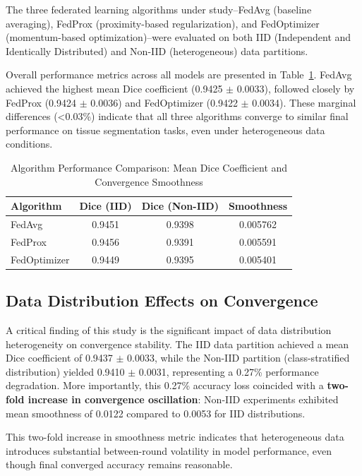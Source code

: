 \documentclass[conference]{IEEEtran}
\begin{document}
The three federated learning algorithms under study--FedAvg (baseline averaging), FedProx (proximity-based regularization), and FedOptimizer (momentum-based optimization)--were evaluated on both IID (Independent and Identically Distributed) and Non-IID (heterogeneous) data partitions. 

Overall performance metrics across all models are presented in Table~\ref{tab:algorithm_comparison}. FedAvg achieved the highest mean Dice coefficient (0.9425 $\pm$ 0.0033), followed closely by FedProx (0.9424 $\pm$ 0.0036) and FedOptimizer (0.9422 $\pm$ 0.0034). These marginal differences (<0.03\%) indicate that all three algorithms converge to similar final performance on tissue segmentation tasks, even under heterogeneous data conditions.

\begin{table}[tbp]
\caption{Algorithm Performance Comparison: Mean Dice Coefficient and Convergence Smoothness}\label{tab:algorithm_comparison}
\centering
\begin{tabular}{|l|c|c|c|}
\hline
\textbf{Algorithm} & \textbf{Dice (IID)} & \textbf{Dice (Non-IID)} & \textbf{Smoothness} \\
\hline
FedAvg & 0.9451 & 0.9398 & 0.005762 \\
FedProx & 0.9456 & 0.9391 & 0.005591 \\
FedOptimizer & 0.9449 & 0.9395 & 0.005401 \\
\hline
\end{tabular}
\end{table}

\subsection{Data Distribution Effects on Convergence}

A critical finding of this study is the significant impact of data distribution heterogeneity on convergence stability. The IID data partition achieved a mean Dice coefficient of 0.9437 $\pm$ 0.0033, while the Non-IID partition (class-stratified distribution) yielded 0.9410 $\pm$ 0.0031, representing a 0.27\% performance degradation. More importantly, this 0.27\% accuracy loss coincided with a \textbf{two-fold increase in convergence oscillation}: Non-IID experiments exhibited mean smoothness of 0.0122 compared to 0.0053 for IID distributions. 

This two-fold increase in smoothness metric indicates that heterogeneous data introduces substantial between-round volatility in model performance, even though final converged accuracy remains reasonable.
\end{document}
